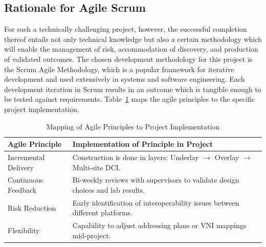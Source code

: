 \subsection{Rationale for Agile Scrum}
For such a technically challenging project, however, the successful completion thereof entails not only technical knowledge but also a certain methodology which will enable the management of risk, accommodation of discovery, and production of validated outcomes. The chosen development methodology for this project is the Scrum Agile Methodology\cite{Scrum_Guide}, which is a popular framework for iterative development and used extensively in systems and software engineering. Each development iteration in Scrum results in an outcome which is tangible enough to be tested against requirements. Table~\ref{tab:agile_implementation} maps the agile principles to the specific project implementation.

\begin{table}[!htbp]
    \centering
    \small
    \begin{tabularx}{\textwidth}{l X}
        \toprule
        \textbf{Agile Principle} & \textbf{Implementation of Principle in Project} \\
        \midrule
        Incremental Delivery & Construction is done in layers: Underlay $\rightarrow$ Overlay $\rightarrow$ Multi-site DCI. \\ \midrule
        Continuous Feedback & Bi-weekly reviews with supervisors to validate design choices and lab results. \\ \midrule
        Risk Reduction & Early identification of interoperability issues between different platforms. \\ \midrule
        Flexibility & Capability to adjust addressing plans or VNI mappings mid-project. \\
        \bottomrule
    \end{tabularx}
    \caption{Mapping of Agile Principles to Project Implementation}
    \label{tab:agile_implementation}
\end{table}


